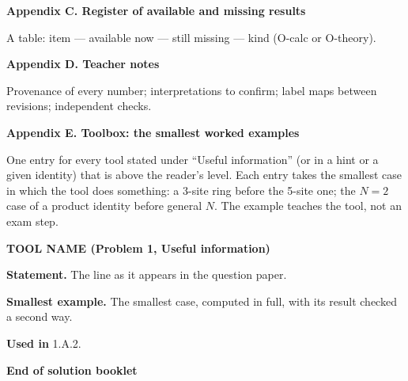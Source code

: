 \documentclass[11pt,a4paper]{article}
\newcommand{\pagetitle}[1]{{\large\bfseries\color{ink}#1}\par\vspace{4pt}}
\newcommand{\smallheading}[1]{\par\Needspace{6\baselineskip}\medskip\textbf{#1}\par}
\begin{document}
\pagetitle{Appendix C. Register of available and missing results}
A table: item --- available now --- still missing --- kind (O-calc or O-theory).

\pagetitle{Appendix D. Teacher notes}
Provenance of every number; interpretations to confirm; label maps between revisions; independent checks.

\clearpage
\pagetitle{Appendix E. Toolbox: the smallest worked examples}
One entry for every tool stated under ``Useful information'' (or in a hint or a given identity) that is above the reader's level. Each entry takes the smallest case in which the tool does something: a 3-site ring before the 5-site one; the $N=2$ case of a product identity before general $N$. The example teaches the tool, not an exam step.

\smallheading{TOOL NAME (Problem 1, Useful information)}
\textbf{Statement.} The line as it appears in the question paper.\par
\textbf{Smallest example.} The smallest case, computed in full, with its result checked a second way.\par
\textbf{Used in} 1.A.2.
\vfill
\begin{center}\textbf{End of solution booklet}\end{center}
\end{document}

